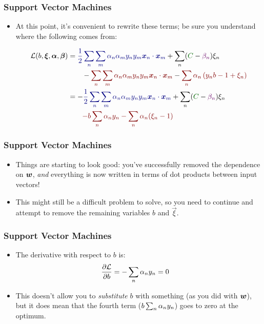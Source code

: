 \documentclass[trans]{beamer}
\begin{document}
\begin{frame}
  \frametitle{Support Vector Machines}
\begin{itemize}
\item 
At this point, it's convenient to rewrite these terms; be sure you
understand where the following comes from:
%
\begin{small}
\begin{align}
\cL(b,\vec\xi,\vec\al,\vec\be)
&= 
  \textcolor{darkblue}{\frac 1 2
    \sum_n \sum_m \al_n \al_m y_n y_m \dotp{\vx_n}{\vx_m}
  }
+ \sum_n (\textcolor{darkergreen}{C} - \textcolor{darkpurple}{\be_n}) \xi_n
\\&\qquad
   - \textcolor{darkred}{
    \sum_n
    \sum_m 
      \al_n \al_m y_n y_m \dotp{\vx_n}{\vx_m}
}
- \textcolor{darkred}{
  \sum_n \al_n \left( y_n b - 1 + \xi_n \right)}\\
&=
-   \textcolor{darkblue}{\frac 1 2
    \sum_n \sum_m \al_n \al_m y_n y_m \dotp{\vx_n}{\vx_m}
  }
+ \sum_n (\textcolor{darkergreen}{C} - \textcolor{darkpurple}{\be_n}) \xi_n
\\&\qquad
\textcolor{darkred}{
-  b \sum_n \al_n y_n 
-  \sum_n \al_n (\xi_n - 1)}
\end{align}
\end{small}
%
\end{itemize}
\end{frame}

\begin{frame}
  \frametitle{Support Vector Machines}
\begin{itemize}
\item 
Things are starting to look good: you've successfully removed the
dependence on ${\boldsymbol{w}}$, \emph{and} everything is now written in terms of
dot products between input vectors!  
\item This might still be a difficult
problem to solve, so you need to continue and attempt to remove the
remaining variables $b$ and $\vec \xi$.
\end{itemize}
\end{frame}

\begin{frame}
  \frametitle{Support Vector Machines}
\begin{itemize}
\item 
The derivative with respect to $b$ is:
%
\begin{align}
\frac {\partial \mathcal{L}} {\partial b}
&= - \sum_n \alpha_n y_n = 0
\end{align}
%
\item
This doesn't allow you to \emph{substitute} $b$ with something (as you
did with ${\boldsymbol{w}}$), but it does mean that the fourth term ($b \sum_n
\alpha_n y_n$) goes to zero at the optimum.
\end{itemize}
\end{frame}
\end{document}
